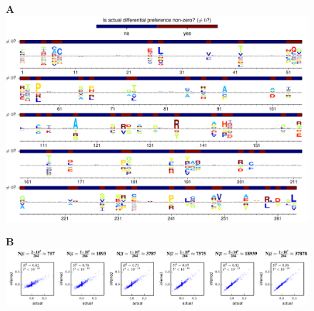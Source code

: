 \documentclass[12pt,letterpaper]{article}
\begin{document}
\begin{figure}

{\bf \Large A} \\
\includegraphics[clip, trim=0 0 0 0.04in,valign=t,width=5.2in]{../../../examples/Melnikov_et_al_Tn5/infer_diffprefs_on_simulated_data/inferred_diffprefs_logoplot.pdf}
\vspace{0.15in}

{\bf \Large B} \\
\includegraphics[clip, trim=0.12in 0 0 0.05in,valign=t,width=6.3in]{../../../examples/Melnikov_et_al_Tn5/infer_diffprefs_on_simulated_data/correlations.pdf}

\end{figure}
\end{document}
